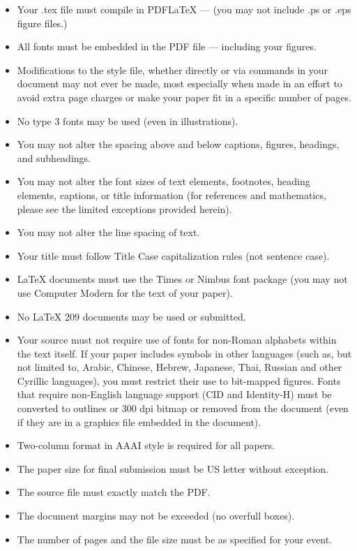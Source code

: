 \documentclass[letterpaper]{article} %
\begin{document}
{\begin{itemize}
\item Your .tex file must compile in PDF\LaTeX{} --- (you may not include .ps or .eps figure files.)
\item All fonts must be embedded in the PDF file --- including your figures.
\item Modifications to the style file, whether directly or via commands in your document may not ever be made, most especially when made in an effort to avoid extra page charges or make your paper fit in a specific number of pages.
\item No type 3 fonts may be used (even in illustrations).
\item You may not alter the spacing above and below captions, figures, headings, and subheadings.
\item You may not alter the font sizes of text elements, footnotes, heading elements, captions, or title information (for references and mathematics, please see the limited exceptions provided herein).
\item You may not alter the line spacing of text.
\item Your title must follow Title Case capitalization rules (not sentence case).
\item \LaTeX{} documents must use the Times or Nimbus font package (you may not use Computer Modern for the text of your paper).
\item No \LaTeX{} 209 documents may be used or submitted.
\item Your source must not require use of fonts for non-Roman alphabets within the text itself. If your paper includes symbols in other languages (such as, but not limited to, Arabic, Chinese, Hebrew, Japanese, Thai, Russian and other Cyrillic languages), you must restrict their use to bit-mapped figures. Fonts that require non-English language support (CID and Identity-H) must be converted to outlines or 300 dpi bitmap or removed from the document (even if they are in a graphics file embedded in the document).
\item Two-column format in AAAI style is required for all papers.
\item The paper size for final submission must be US letter without exception.
\item The source file must exactly match the PDF.
\item The document margins may not be exceeded (no overfull boxes).
\item The number of pages and the file size must be as specified for your event.

\end{itemize}}
\end{document}
